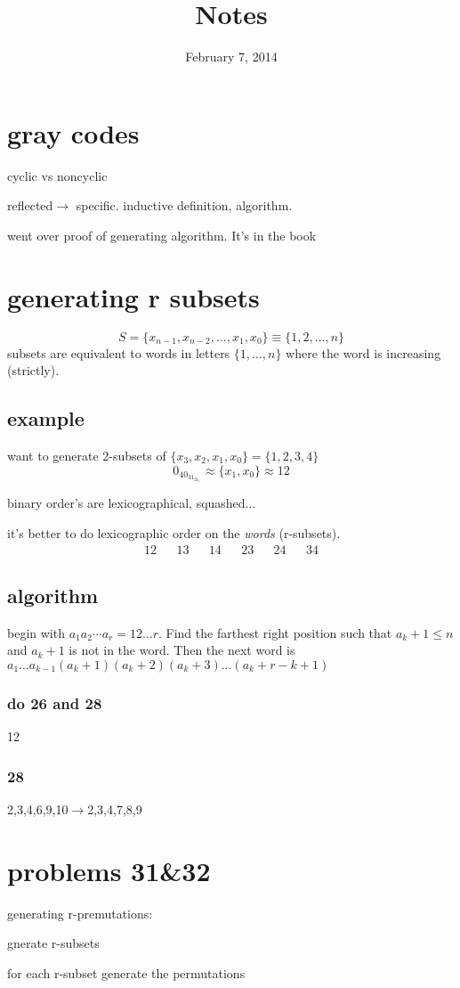 \documentclass{article}
\begin{document}
\title{Notes}
\date{February 7, 2014}
\maketitle
\section*{gray codes}
cyclic vs noncyclic

reflected$\to$ specific. inductive definition, algorithm.

went over proof of generating algorithm. It's in the book
\section*{generating r subsets}
\[S=\{x_{n-1},x_{n-2},\dots,x_1,x_0\}\equiv \{1,2,\dots,n\}\]
subsets are equivalent to words in letters $\{1,\dots,n\}$ where the word is increasing (strictly).

\subsection*{example}
want to generate 2-subsets of $\{x_3,x_2,x_1,x_0\}=\{1,2,3,4\}$
\[0_40_31_21_1\approx\{x_1,x_0\}\approx12\]

binary order's are lexicographical, squashed...

it's better to do lexicographic order on the \emph{words} (r-subsets).
\begin{align*}
  12&&
  13&&
  14&&
  23&&
  24&&
  34
\end{align*}
\subsection*{algorithm}
begin with $a_1a_2\cdots a_r=12\dots r$. Find the farthest right position such that $a_k+1\leq n$ and $a_k+1$ is not in the word. Then the next word is $a_1\dots a_{k-1}(a_k+1)(a_k+2)(a_k+3)\dots(a_k+r-k+1)$

\subsubsection*{do 26 and 28}
12 
\subsubsection*{28}
2,3,4,6,9,10$\to$2,3,4,7,8,9
\section*{problems 31\&32}
generating r-premutations:

gnerate r-subsets

for each r-subset generate the permutations
\end{document}
